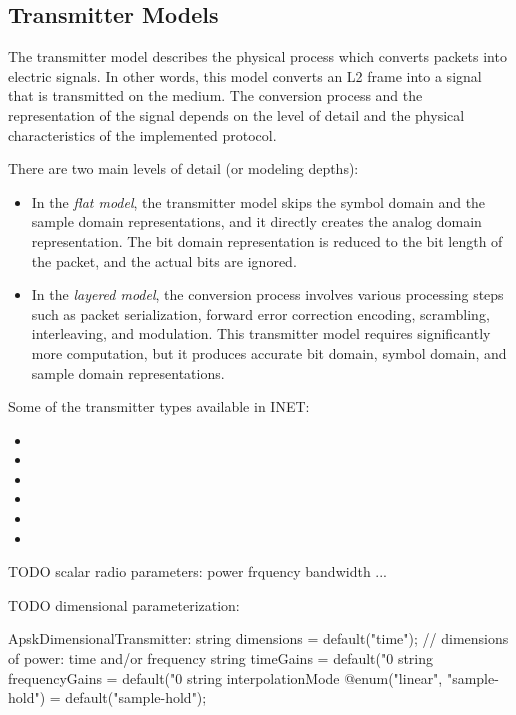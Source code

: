 \subsection{Transmitter Models}

The transmitter model describes the physical process which converts packets into
electric signals. In other words, this model converts an L2 frame into a signal
that is transmitted on the medium. The conversion process and the representation
of the signal depends on the level of detail and the physical characteristics
of the implemented protocol.

There are two main levels of detail (or modeling depths):
 
\begin{itemize}
\item In the \textit{flat model}, the transmitter model skips the symbol domain 
and the sample domain representations, and it directly creates the analog domain 
representation. The bit domain representation is reduced to the bit length of 
the packet, and the actual bits are ignored.

\item In the \textit{layered model}, the conversion process involves various 
processing steps such as packet serialization, forward error correction encoding, 
scrambling, interleaving, and modulation. This transmitter model requires 
significantly more computation, but it produces accurate bit domain, 
symbol domain, and sample domain representations.
\end{itemize}

Some of the transmitter types available in INET:

\begin{itemize}
  \item {}
  \item {}
  \item {}
  \item {}
  \item {}
  \item {}
\end{itemize}

TODO scalar radio parameters:
    power
    frquency
    bandwidth
    ...

TODO dimensional parameterization: 

 ApskDimensionalTransmitter:
        string dimensions = default("time");                // dimensions of power: time and/or frequency
        string timeGains = default("0%
        string frequencyGains = default("0%
        string interpolationMode @enum("linear", "sample-hold") = default("sample-hold");


